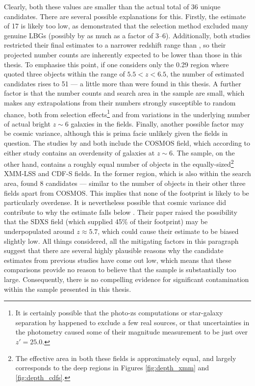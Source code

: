 Clearly, both these values are smaller than the actual \DESVIDEO total of 36 unique candidates. There are several possible explanations for this. Firstly, the \cite{2013AJ....145....4W} estimate of 17 is likely too low, as \cite{2015MNRAS.452.1817B} demonstrated that the \cite{2013AJ....145....4W} selection method excluded many genuine LBGs (possibly by as much as a factor of \numrange{3}{6}). Additionally, both studies restricted their final estimates to a narrower redshift range than \DESVIDEO, so their projected number counts are inherently expected to be lower than those in this thesis. To emphasise this point, if one considers only the \SI{0.29}{\sqdeg} region where \cite{2015MNRAS.452.1817B} quoted three objects within the \DESVIDEO range of $5.5 <  z <  6.5$, the number of estimated candidates rises to 51 --- a little more than were found in this thesis. A further factor is that the number counts and search area in the  \cite{2015MNRAS.452.1817B} sample are small, which makes any extrapolations from their numbers strongly susceptible to random chance, both from selection effects\footnote{It is certainly possible that the photo-zs computations or star-galaxy separation by \cite{2015MNRAS.452.1817B} happened to exclude a few real sources, or that uncertainties in the photometry caused some of their magnitude measurement to be just over $z'=25.0$.} and from variations in the underlying number of actual bright $z\sim6$ galaxies in the fields. Finally, another possible factor may be cosmic variance, although this is prima facie unlikely given the fields in question. The studies by \cite{2013AJ....145....4W} and \cite{2015MNRAS.452.1817B} both include the COSMOS field, which according to either study contains an overdensity of galaxies at $z\sim6$. The \DESVIDEO sample, on the other hand, contains a roughly equal number of objects in the equally-sized\footnote{The effective area in both these fields is approximately equal, and largely corresponds to the deep regions in Figures \ref{fig:depth_xmm} and \ref{fig:depth_cdfs}.} XMM-LSS and CDF-S fields. In the former region, which is also within the \cite{2013AJ....145....4W} search area, \cite{2013AJ....145....4W} found 8 candidates --- similar to the number of objects in their other three fields apart from COSMOS. This implies that none of the \DESVIDEO footprint is likely to be particularly overdense. It is nevertheless possible that cosmic variance did contribute to why the \cite{2015MNRAS.452.1817B} estimate falls below \DESVIDEO. Their paper raised the possibility that the SDXS field (which supplied 45\% of their footprint) may be underpopulated around $z\approx5.7$, which could cause their estimate to be biased slightly low. All things considered, all the mitigating factors in this paragraph suggest that there are several highly plausible reasons why the candidate estimates from previous studies have come out low, which means that these comparisons provide no reason to believe that the \DESVIDEO sample is substantially too large. Consequently, there is no compelling evidence for significant contamination within the sample presented in this thesis. \par 




